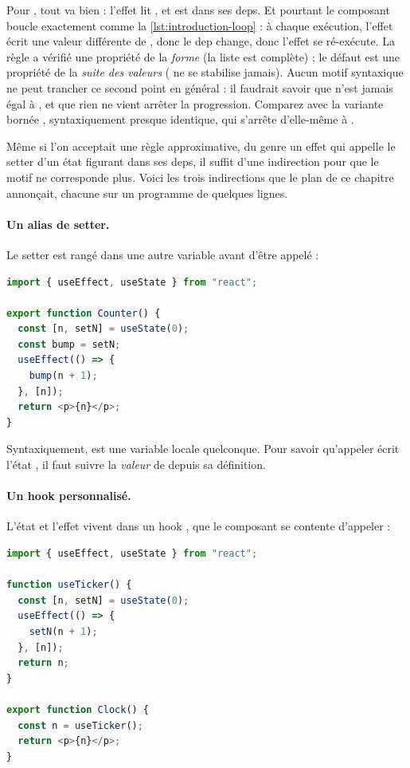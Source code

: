 Pour , tout va bien : l'effet lit , et 
est dans ses deps. Et pourtant le composant boucle exactement comme la
\cref{lst:introduction-loop} : à chaque exécution, l'effet écrit une valeur
différente de , donc le dep  change, donc l'effet se
ré-exécute. La règle a vérifié une propriété de la \emph{forme} (\og la liste
est complète\fg{}) ; le défaut est une propriété de la \emph{suite des valeurs}
(\og {} ne se stabilise jamais\fg{}). Aucun motif syntaxique ne peut
trancher ce second point en général : il faudrait savoir que  n'est
jamais égal à , et que rien ne vient arrêter la progression.
Comparez avec la variante bornée , syntaxiquement
presque identique, qui s'arrête d'elle-même à .

Même si l'on acceptait une règle approximative, du genre \og un effet qui
appelle le setter d'un état figurant dans ses deps\fg{}, il suffit d'une
indirection pour que le motif ne corresponde plus. Voici les trois indirections
que le plan de ce chapitre annonçait, chacune sur un programme de quelques
lignes.

\paragraph{Un alias de setter.} Le setter est rangé dans une autre variable
avant d'être appelé :

\begin{lstlisting}[language=TypeScript,caption={Alias de setter (\file{/tmp/ch01/alias.tsx})},label={lst:introduction-alias}]
import { useEffect, useState } from "react";

export function Counter() {
  const [n, setN] = useState(0);
  const bump = setN;
  useEffect(() => {
    bump(n + 1);
  }, [n]);
  return <p>{n}</p>;
}
\end{lstlisting}

Syntaxiquement,  est une variable locale quelconque. Pour savoir
qu'appeler  écrit l'état , il faut suivre la \emph{valeur}
de  depuis sa définition.

\paragraph{Un hook personnalisé.} L'état et l'effet vivent dans un hook
, que le composant se contente d'appeler :

\begin{lstlisting}[language=TypeScript,caption={Boucle cachée dans un hook personnalisé (\file{/tmp/ch01/custom_hook.tsx})},label={lst:introduction-custom-hook}]
import { useEffect, useState } from "react";

function useTicker() {
  const [n, setN] = useState(0);
  useEffect(() => {
    setN(n + 1);
  }, [n]);
  return n;
}

export function Clock() {
  const n = useTicker();
  return <p>{n}</p>;
}
\end{lstlisting}

